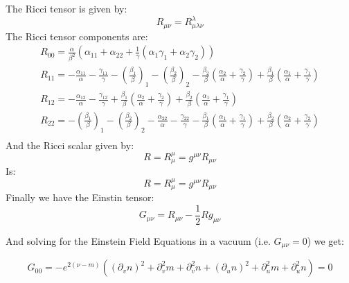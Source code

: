\documentclass{article}
\begin{document}
The Ricci tensor is given by:
\begin{equation}
R_{\mu\nu}=R_{\mu\lambda\nu}^{\lambda}
\end{equation}
The Ricci tensor components are:
\begin{equation}
\begin{array}{l}
R_{00}=\frac{\alpha}{\beta^{2}}\left(\alpha_{11}+\alpha_{22}+\frac{1}{\gamma}\left(\alpha_{1}\gamma_{1}+\alpha_{2}\gamma_{2}\right)\right)\\
R_{11}=-\frac{\alpha_{11}}{\alpha}-\frac{\gamma_{11}}{\gamma}-\left(\frac{\beta_{1}}{\beta}\right)_{1}-\left(\frac{\beta_{2}}{\beta}\right)_{2}-\frac{\beta_{2}}{\beta}\left(\frac{\alpha_{2}}{\alpha}+\frac{\gamma_{2}}{\gamma}\right)+\frac{\beta_{1}}{\beta}\left(\frac{\alpha_{1}}{\alpha}+\frac{\gamma_{1}}{\gamma}\right)\\
R_{12}=-\frac{\alpha_{12}}{\alpha}-\frac{\gamma_{12}}{\gamma}+\frac{\beta_{1}}{\beta}\left(\frac{\alpha_{2}}{\alpha}+\frac{\gamma_{2}}{\gamma}\right)+\frac{\beta_{2}}{\beta}\left(\frac{\alpha_{1}}{\alpha}+\frac{\gamma_{1}}{\gamma}\right)\\
R_{22}=-\left(\frac{\beta_{1}}{\beta}\right)_{1}-\left(\frac{\beta_{2}}{\beta}\right)_{2}-\frac{\alpha_{22}}{\alpha}-\frac{\gamma_{22}}{\gamma}-\frac{\beta_{1}}{\beta}\left(\frac{\alpha_{1}}{\alpha}+\frac{\gamma_{1}}{\gamma}\right)+\frac{\beta_{2}}{\beta}\left(\frac{\alpha_{2}}{\alpha}+\frac{\gamma_{2}}{\gamma}\right)\\
\end{array}
\end{equation}
And the Ricci scalar given by:
\begin{equation}
R=R_{\mu}^{\mu}=g^{\mu\nu}R_{\mu\nu}
\end{equation}
Is:
\begin{equation}
R=R_{\mu}^{\mu}=g^{\mu\nu}R_{\mu\nu}
\end{equation}
Finally we have the Einstin tensor:
\begin{equation}
G_{\mu\nu}=R_{\mu\nu}-\frac{1}{2}Rg_{\mu\nu}
\end{equation}

And solving for the Einstein Field Equations in a vacuum (i.e. $G_{\mu\nu}=0$)
we get:

\begin{equation}
G_{00}=-e^{2(\nu-m)}\left(\left(\partial_{v}n\right)^{2}+\partial_{v}^{2}m+\partial_{v}^{2}n+\left(\partial_{u}n\right)^{2}+\partial_{u}^{2}m+\partial_{u}^{2}n\right)=0\label{eq:G00}
\end{equation}
\end{document}
